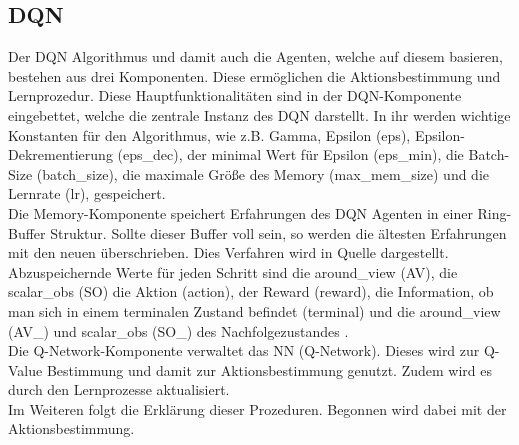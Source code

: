\subsection{DQN} \label{subsec:Konzept_DQN}
Der DQN Algorithmus und damit auch die Agenten, welche auf diesem basieren, bestehen aus drei Komponenten. Diese ermöglichen die Aktionsbestimmung und Lernprozedur.
Diese Hauptfunktionalitäten sind in der DQN-Komponente eingebettet, welche die zentrale Instanz des DQN darstellt. In ihr werden wichtige Konstanten für den Algorithmus, wie z.B. Gamma, Epsilon (eps), Epsilon-Dekrementierung (eps\_dec), der minimal Wert für Epsilon (eps\_min), die Batch-Size (batch\_size), die maximale Größe des Memory (max\_mem\_size) und die Lernrate (lr), gespeichert.\\
Die Memory-Komponente speichert Erfahrungen des DQN Agenten in einer Ring-Buffer Struktur. Sollte dieser Buffer voll sein, so werden die ältesten Erfahrungen mit den neuen überschrieben. Dies Verfahren wird in Quelle \citep[S. 5]{DBLP:journals/corr/MnihKSGAWR13} dargestellt.
Abzuspeichernde Werte für jeden Schritt sind die around\_view (AV), die scalar\_obs (SO) die Aktion (action), der Reward (reward), die Information, ob man sich in einem terminalen Zustand befindet (terminal) und die around\_view (AV\_) und scalar\_obs (SO\_) des Nachfolgezustandes .\\
Die Q-Network-Komponente verwaltet das NN (Q-Network). Dieses wird zur Q-Value Bestimmung und damit zur Aktionsbestimmung genutzt. Zudem wird es durch den Lernprozesse aktualisiert.\\
Im Weiteren folgt die Erklärung dieser Prozeduren. Begonnen wird dabei mit der Aktionsbestimmung.

